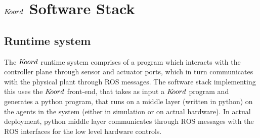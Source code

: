 \section{$K\kern-2pt oord$ Software Stack}
\label{sec:software}

\subsection{Runtime system}
 The $K\kern-2pt oord$ runtime system comprises of a program which interacts with the controller plane through sensor and actuator ports, which in turn communicates with the physical plant through ROS messages. The software stack implementing this uses the $K\kern-2pt oord$ front-end, that takes as input a $K\kern-2pt oord$ program and generates a python program, that runs on a middle layer (written in python) on the agents in the system (either in simulation or on actual hardware). In actual deployment, python middle layer communicates through ROS messages with the ROS interfaces for the low level hardware controls. 

